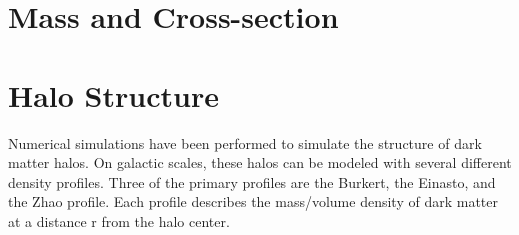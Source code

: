 %
%
%
%
%
%


\section{Mass and Cross-section}


\section{Halo Structure}
Numerical simulations have been performed to simulate the structure of dark matter halos.
On galactic scales, these halos can be modeled with several different density profiles.
Three of the primary profiles are the Burkert, the Einasto, and the Zhao profile.
Each profile describes the mass/volume density of dark matter at a distance r from the halo center.

